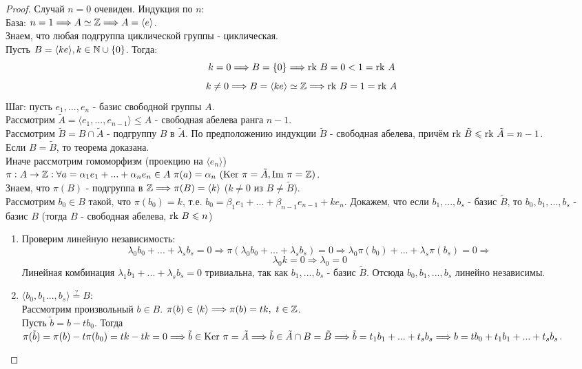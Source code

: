 \begin{proof}
    Случай $n = 0$ очевиден. Индукция по $n$:\\
    \tab База: $n = 1 \Longrightarrow A \simeq \mathbb{Z} \Longrightarrow A = \langle e \rangle$.\\
    Знаем, что любая подгруппа циклической группы - циклическая.\\
    Пусть $B = \langle ke \rangle, k \in \mathbb{N} \cup \{0\}$. Тогда:
    \[k = 0 \Longrightarrow B = \{0\} \Longrightarrow \textup{rk }B = 0 < 1 = \textup{rk }A\]
    \[k \neq 0 \Longrightarrow B = \langle ke \rangle \simeq \mathbb{Z} \Longrightarrow \textup{rk }B = 1 = \textup{rk }A\]
    \tab Шаг: пусть $e_1,...,e_n$ - базис свободной группы $A$.\\
    Рассмотрим $\tilde{A} = \langle e_1,...,e_{n-1} \rangle \leq A$ - свободная абелева ранга $n-1$.\\
    Рассмотрим $\tilde{B} = B \cap \tilde{A}$ - подгруппу $B$ в $\tilde{A}$. По предположению индукции $\tilde{B}$ - свободная абелева, причём $\textup{rk }\tilde{B} \leqslant \textup{rk }\tilde{A} = n-1$.\\
    Если $B = \tilde{B}$, то теорема доказана. \\
    Иначе рассмотрим гомоморфизм (проекцию на $\langle e_n \rangle$) \\ $\pi: A \rightarrow \mathbb{Z}: \forall a = \alpha_1e_1 + ... + \alpha_ne_n \in A \ \pi(a) = \alpha_n \ (\textup{Ker }\pi = \tilde{A}, \textup{Im }\pi = \mathbb{Z})$.\\
    Знаем, что $\pi(B)$ - подгруппа в $\mathbb{Z} \Longrightarrow \pi(B) = \langle k \rangle$ ($k \neq 0$ из $B \neq \tilde{B}$).\\
    Рассмотрим $b_0 \in B$ такой, что $\pi(b_0) = k$, т.е. $b_0 = \beta_1e_1 + ... + \beta_{n-1}e_{n-1} + ke_n$. Докажем, что если $b_1,...,b_s$ - базис $\tilde{B}$, то $b_0, b_1,...,b_s$ - базис $B$ (тогда $B$ - свободная абелева, $\textup{rk }B \leqslant n$)
    \begin{enumerate}
        \item Проверим линейную независимость:
        \[\lambda_0b_0 + ... + \lambda_sb_s = 0 \Rightarrow \pi(\lambda_0b_0 + ... + \lambda_sb_s) = 0 \Rightarrow \lambda_0\pi(b_0) + ... + \lambda_s\pi(b_s) = 0 \Longrightarrow\]
        \[\lambda_0k = 0 \Rightarrow \lambda_0 = 0\]
        Линейная комбинация $\lambda_1b_1 + ... + \lambda_sb_s = 0$ тривиальна, так как $b_1,...,b_s$ - базис $\tilde{B}$. Отсюда $b_0,b_1,...,b_s$ линейно независимы.
        \item $\langle b_0,b_1...,b_s \rangle \overset{?}{=} B$:\\
        Рассмотрим произвольный $b \in B$. $\pi(b) \in \langle k \rangle \Longrightarrow \pi(b) = tk, \ t \in \mathbb{Z}$.\\
        Пусть $\tilde{b} = b - tb_0$. Тогда $\pi(\tilde{b}) = \pi(b) - t\pi(b_0) = tk - tk = 0 \Longrightarrow \tilde{b} \in \textup{Ker }\pi = \tilde{A} \Longrightarrow \tilde{b} \in \tilde{A} \cap B = \tilde{B} \Longrightarrow \tilde{b} = t_1b_1 + ... + t_sb_s \Longrightarrow b = tb_0 + t_1b_1 + ... + t_sb_s$.
    \end{enumerate}
\end{proof}
